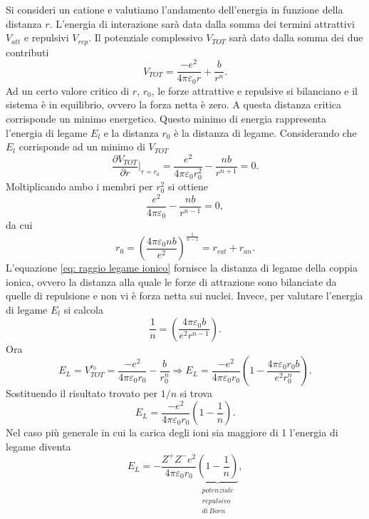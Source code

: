 Si consideri un catione e valutiamo l'andamento dell'energia in funzione della distanza $r$. L'energia di interazione sarà data dalla somma dei termini attrattivi $V_{att}$ e repulsivi $V_{rep}$.
Il potenziale complessivo $V_{TOT}$ sarà dato dalla somma dei due contributi
\begin{equation}
    V_{TOT}=\frac{-e^2}{4\pi\varepsilon_0r}+\frac{b}{r^n}.
\end{equation}
Ad un certo valore critico di $r$, $r_0$, le forze attrattive e repulsive si bilanciano e il sistema è in equilibrio, ovvero la forza netta è zero. A questa distanza critica corrisponde un minimo energetico. Questo minimo di energia rappresenta l'energia di legame $E_l$ e la distanza $r_0$ è la distanza di legame. Considerando che $E_l$ corrisponde
ad un minimo di $V_{TOT}$
\begin{equation}
    \frac{\partial V_{TOT}}{\partial r}\bigg|_{r=r_0}=\frac{e^2}{4\pi\varepsilon_0 r_0^2}-\frac{nb}{r^{n+1}}=0.
\end{equation}
Moltiplicando ambo i membri per $r_0^2$ si ottiene
\begin{equation}
    \frac{e^2}{4\pi\varepsilon_0}-\frac{nb}{r^{n-1}}=0,
\end{equation}
da cui
\begin{equation}
\label{eq: raggio legame ionico}
    r_0=\left(\frac{4\pi\varepsilon_0nb}{e^2}\right)^{\frac{1}{n-1}}=r_{cat} + r_{an}.
\end{equation}
L'equazione \eqref{eq: raggio legame ionico} fornisce la distanza di legame della coppia ionica, ovvero la distanza alla quale le forze di attrazione sono bilanciate da quelle di repulsione e non vi è forza netta sui nuclei. Invece, per valutare l'energia di legame $E_l$ si calcola
\begin{equation}
    \frac{1}{n}=\left(\frac{4\pi\varepsilon_0b}{e^2 r^{n-1}}\right).
\end{equation}
Ora
\begin{equation}
    E_L=V_{TOT}^{r_0}=\frac{-e^2}{4\pi\varepsilon_0r_0}-\frac{b}{r_0^n}\Rightarrow E_L=\frac{-e^2}{4\pi\varepsilon_0r_0} \left(1-\frac{4\pi\varepsilon_0r_0b}{e^2 r_0^n}\right).
\end{equation}
Sostituendo il risultato trovato per $1/n$ si trova 
\begin{equation}
    E_L=\frac{-e^2}{4\pi\varepsilon_0r_0}\left(1-\frac{1}{n}\right).
\end{equation}
Nel
caso più generale in cui la carica degli ioni sia maggiore di 1 l'energia di legame diventa
\begin{equation}
    E_L=-\frac{Z^+Z^-e^2}{4\pi\varepsilon_0r_0}\underbrace{\left(1-\frac{1}{n}\right)}_{\substack{potenziale\\repulsivo\\di\,Born}},
    \label{eq:en.reticolare}
\end{equation}
